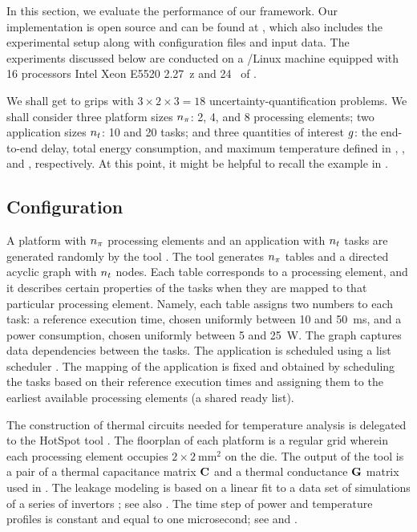 In this section, we evaluate the performance of our framework. Our
implementation is open source and can be found at \cite{sources}, which also
includes the experimental setup along with configuration files and input data.
The experiments discussed below are conducted on a /Linux machine
equipped with 16 processors Intel Xeon E5520 2.27~z and 24~ of
.

We shall get to grips with $3 \times 2 \times 3 = 18$ uncertainty-quantification
problems. We shall consider three platform sizes ${n_\pi}$: 2, 4, and 8 processing
elements; two application sizes ${n_t}$: 10 and 20 tasks; and three quantities of
interest $g$: the end-to-end delay, total energy consumption, and maximum
temperature defined in , , and
, respectively. At this point, it might be helpful to
recall the example in .

\subsection{Configuration} 

A platform with ${n_\pi}$ processing elements and an application with ${n_t}$ tasks
are generated randomly by the  tool \cite{dick1998}. The tool generates
${n_\pi}$ tables and a directed acyclic graph with ${n_t}$ nodes. Each table
corresponds to a processing element, and it describes certain properties of the
tasks when they are mapped to that particular processing element. Namely, each
table assigns two numbers to each task: a reference execution time, chosen
uniformly between 10 and 50~ms, and a power consumption, chosen uniformly
between 5 and 25~W. The graph captures data dependencies between the tasks. The
application is scheduled using a list scheduler \cite{adam1974}. The mapping of
the application is fixed and obtained by scheduling the tasks based on their
reference execution times and assigning them to the earliest available
processing elements (a shared ready list).

The construction of thermal  circuits needed for temperature analysis is
delegated to the HotSpot tool \cite{skadron2004}. The floorplan of each platform
is a regular grid wherein each processing element occupies $2 \times
2~\text{mm}^2$ on the die. The output of the tool is a pair of a thermal
capacitance matrix $\mathbf{C}$ and a thermal conductance $\mathbf{G}$ matrix used in
. The leakage modeling is based on a linear fit to a data
set of  simulations of a series of  invertors
\cite{ukhov2012, liu2007}; see also \cite{ukhov2014}. The time step of power and
temperature profiles is constant and equal to one microsecond; see 
and .

